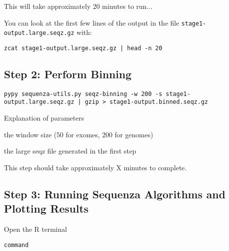 This will take approximately 20 minutes to run...

\begin{information}
You can look at the first few lines of the output in the file \texttt{stage1-output.large.seqz.gz} with:
 
\begin{lstlisting}
zcat stage1-output.large.seqz.gz | head -n 20
\end{lstlisting}
\end{information}


\subsection{Step 2: Perform Binning}

\begin{steps}
\begin{lstlisting}
pypy sequenza-utils.py seqz-binning -w 200 -s stage1-output.large.seqz.gz | gzip > stage1-output.binned.seqz.gz
\end{lstlisting}
\end{steps}

\begin{note}
Explanation of parameters
\begin{description}[style=multiline,labelindent=0cm,align=right,leftmargin=\descriptionlabelspace,rightmargin=1.5cm,font=\ttfamily]
 \item[-w] the window size (50 for exomes, 200 for genomes)
 \item[-s] the large seqz file generated in the first step
\end{description}
\end{note}

This step should take approximately X minutes to complete.


\subsection{Step 3: Running Sequenza Algorithms and Plotting Results}

\begin{steps}
Open the R terminal
\begin{lstlisting}
command
\end{lstlisting}
\end{steps}

